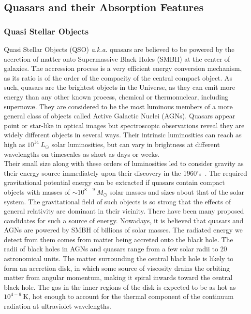\vspace*{1.5pc}

\subsection{Quasars and their Absorption Features}

\subsubsection{Quasi Stellar Objects}
\label{sec:qso}

Quasi Stellar Objects (QSO) \textit{a.k.a.} quasars are believed to be powered by the accretion of matter onto Supermassive Black
Holes (SMBH) at the center of galaxies. The accression process is a very efficient energy conversion mechanism, as its ratio is of the order of the compacity of the central compact object. As such, quasars are the brightest objects in the Universe, as they can emit more energy than any other known process, chemical or thermonuclear, including supernov{\ae}. They are considered to be the most luminous members of a more general class of objects called Active Galactic Nuclei (AGNs). Quasars appear point or star-like in optical images but spectroscopic observations reveal they are widely different objects in several ways. Their intrinsic luminosities can reach as high as $10^{14}~L_\odot$ solar luminosities, but can vary in brightness at different wavelengths on timescales as short as days or weeks. \\

Their small size along with these orders of luminosities led to consider gravity as their energy source immediately upon their discovery in the 1960's~\citep{Matthews1963}. The required gravitational potential energy can be extracted if quasars contain compact objects with masses of $\sim 10^{8-9}~ M_\odot$ solar masses and sizes about that of the solar system. The
gravitational field of such objects is so strong that the effects of general relativity are dominant in their vicinity. There have been many proposed candidates for such a source of energy. Nowadays, it is believed that quasars and AGNs are powered by SMBH of billions of solar masses. The radiated energy we detect from them comes from matter being accreted onto the black hole. The radii of black holes in AGNs and quasars range from a few solar radii to 20 astronomical units. The matter surrounding the central black hole is likely to form an accretion disk, in which some source of viscosity drains the orbiting matter from angular momentum, making it spiral inwards toward the central black hole. The gas in the inner
regions of the disk is expected to be as hot as $10^{4-6}~\mathrm{K}$, hot enough to account for the thermal component of the continuum radiation at  ultraviolet wavelengths. \\

